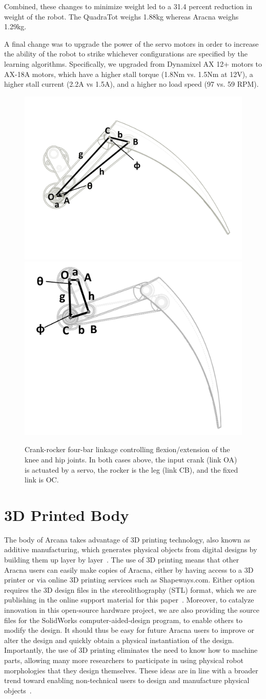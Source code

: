 \documentclass[letterpaper]{article}
\begin{document}
Combined, these changes to minimize weight led to a 31.4 percent reduction in weight of the robot. The QuadraTot weighs 1.88kg whereas Aracna weighs 1.29kg.

A final change was to upgrade the power of the servo motors in order to increase the ability of the robot to strike whichever configurations are specified by the learning algorithms. Specifically, we upgraded from Dynamixel AX 12+ motors to AX-18A motors, which have a higher stall torque (1.8Nm vs. 1.5Nm at 12V), a higher stall current (2.2A vs 1.5A), and a higher no load speed (97 vs. 59 RPM).


\begin{figure}[t]
\begin{center}
\includegraphics[width=.23\textwidth]{fig3.pdf}
\includegraphics[width=.23\textwidth]{fig4.pdf}
\caption{Crank-rocker four-bar linkage controlling flexion/extension of
  the knee and hip joints. In both cases above, the input crank (link
  OA) is actuated by a servo, the rocker is the leg (link CB), and the
  fixed link is OC.}
\label{crankRocker}
\end{center}
\end{figure}


\section{3D Printed Body}

The body of Arcana takes advantage of 3D printing technology, also known as additive manufacturing, which generates physical objects from digital designs by building them up layer by layer~\citep{gibson2009additive, lipson2010factory}. The use of 3D printing means that other Aracna users can easily make copies of Aracna, either by having access to a 3D printer or via online 3D printing services such as Shapeways.com. Either option requires the 3D design files in the stereolithography (STL) format, which we are publishing in the online support material for this paper~\citep{WEB}. Moreover, to catalyze innovation in this open-source hardware project, we are also providing the source files for the SolidWorks computer-aided-design program, to enable others to modify the design. It should thus be easy for future Aracna users to improve or alter the design and quickly obtain a physical instantiation of the design. Importantly, the use of 3D printing eliminates the need to know how to machine parts, allowing many more researchers to participate in using physical robot morphologies that they design themselves. These ideas are in line with a broader trend toward enabling non-technical users to design and manufacture physical objects~\citep{clune2011objects, clune2011endless, lipson2010factory}.
\end{document}
